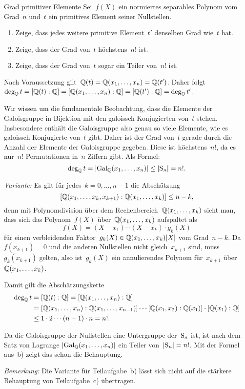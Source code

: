 \documentclass{algblatt}
\begin{document}
\begin{aufgabe}{Grad primitiver Elemente}
Sei~$f(X)$ ein normiertes separables Polynom vom Grad~$n$ und~$t$ ein
primitives Element seiner Nullstellen.
\begin{enumerate}
\item Zeige, dass jedes weitere primitive Element~$t'$ denselben Grad wie~$t$
hat.
\item Zeige, dass der Grad von~$t$ höchstens~$n!$ ist.
\item Zeige, dass der Grad von~$t$ sogar ein Teiler von~$n!$ ist.
\end{enumerate}

\begin{loesungE}
\item Nach Voraussetzung gilt~$\mathbb{Q}(t) = \mathbb{Q}(x_1,\ldots,x_n) = \mathbb{Q}(t')$. Daher
folgt $\deg_{\mathbb{Q}} t = [\mathbb{Q}(t):\mathbb{Q}] = [\mathbb{Q}(x_1,\ldots,x_n):\mathbb{Q}] =
[\mathbb{Q}(t'):\mathbb{Q}] = \deg_{\mathbb{Q}} t'$.

\item Wir wissen um die fundamentale Beobachtung, dass die Elemente der
Galoisgruppe in Bijektion mit den galoissch Konjugierten von~$t$ stehen.
Insbesondere enthält die Galoisgruppe also genau so viele Elemente, wie es
galoissch Konjugierte von~$t$ gibt. Daher ist der Grad von~$t$ gerade durch
die Anzahl der Elemente der Galoisgruppe gegeben. Diese ist höchstens~$n!$, da
es nur~$n!$ Permutationen in~$n$ Ziffern gibt. Als Formel:
\[ \deg_{\mathbb{Q}} t = |\mathrm{Gal}_{\mathbb{Q}}(x_1,\ldots,x_n)| \leq |\mathrm{S}_n| = n!. \]

\emph{Variante:} Es gilt für jedes~$k = 0,\ldots,n-1$ die Abschätzung
\[ [\mathbb{Q}(x_1,\ldots,x_k,x_{k+1}):\mathbb{Q}(x_1,\ldots,x_k)] \leq n - k, \]
denn mit Polynomdivision über dem Rechenbereich~$\mathbb{Q}(x_1,\ldots,x_k)$ sieht
man, dass sich das Polynom~$f(X)$ über~$\mathbb{Q}(x_1,\ldots,x_k)$ aufspaltet als
\[ f(X) = (X-x_1) \cdots (X-x_k) \cdot g_k(X) \]
für einen verbleidenden Faktor~$g_k(X) \in \mathbb{Q}(x_1,\ldots,x_k)[X]$ vom
Grad~$n-k$. Da~$f(x_{k+1}) = 0$ und die anderen Nullstellen nicht gleich~$x_{k+1}$ sind,
muss~$g_k(x_{k+1})$ gelten, also ist~$g_k(X)$ ein annulierendes Polynom
für~$x_{k+1}$ über~$\mathbb{Q}(x_1,\ldots,x_k)$.

Damit gilt die Abschätzungskette
\begin{align*}
  \deg_{\mathbb{Q}} t &= [\mathbb{Q}(t):\mathbb{Q}] = [\mathbb{Q}(x_1,\ldots,x_n):\mathbb{Q}] \\
  &= [\mathbb{Q}(x_1,\ldots,x_n):\mathbb{Q}(x_1,\ldots,x_{n-1})] \cdots
    [\mathbb{Q}(x_1,x_2):\mathbb{Q}(x_1)] \cdot [\mathbb{Q}(x_1):\mathbb{Q}] \\
  &\leq 1 \cdot 2 \cdots (n-1) \cdot n = n!.
\end{align*}

\item Da die Galoisgruppe der Nullstellen eine Untergruppe der~$\mathrm{S}_n$ ist, ist
nach dem Satz von Lagrange $|\mathrm{Gal}_{\mathbb{Q}}(x_1,\ldots,x_n)|$ ein Teiler von~$|\mathrm{S}_n| =
n!$. Mit der Formel aus~b) zeigt das schon die Behauptung.

\emph{Bemerkung:} Die Variante für Teilaufgabe~b) lässt sich nicht auf die
stärkere Behauptung von Teilaufgabe~c) übertragen.
\end{loesungE}
\end{aufgabe}
\end{document}
